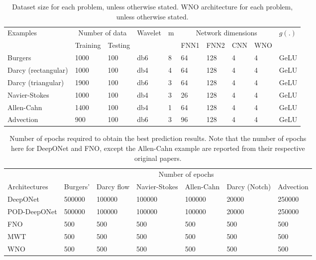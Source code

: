 \documentclass{article}
\begin{document}
\begin{table}[ht!]
    \centering
    \caption{Dataset size for each problem, unless otherwise stated. WNO architecture for each problem, unless otherwise stated.}
    \label{tab:network_param}
    \begin{tabular}{p{4cm}lllllllll}
    \hline
    \multirow{2}{*}{Examples} & \multicolumn{2}{c}{Number of data} & \multirow{2}{*}{Wavelet} & \multirow{2}{*}{m} & \multicolumn{4}{c}{Network dimensions} & \multirow{2}{*}{$g(.)$} \\ \cline{2-3}\cline{6-9}
     & Training & Testing & & & FNN1 & FNN2 & CNN & WNO & \\
    \hline
    Burgers & 1000 & 100 & db6 & 8 & 64 & 128 & 4 & 4 & GeLU\\
    Darcy (rectangular) & 1000 & 100 & db4 & 4 & 64 & 128 & 4 & 4 & GeLU\\
    Darcy (triangular) & 1900 & 100 & db6 & 3 & 64 & 128 & 4 & 4 & GeLU \\
    Navier-Stokes & 1000 & 100 & db4 & 3 & 26 & 128 & 4 & 4 & GeLU\\
    Allen-Cahn & 1400 & 100 & db4 & 1 & 64 & 128 & 4 & 4 & GeLU\\
    Advection & 900 & 100 & db6 & 3 & 96 & 128 & 4 & 4 & GeLU\\
    \hline
    \end{tabular}
\end{table}

\begin{table}[ht]
	\centering
	\caption{Number of epochs required to obtain the best prediction results. Note that the number of epochs here for DeepONet and FNO, except the Allen-Cahn example are reported from their respective original papers.}
	\label{table_epochs}
	\begin{tabular}{p{3cm} llllll}
		\hline
		& \multicolumn{6}{c}{Number of epochs} \\ \cline{2-7}
		Architectures & Burgers' & Darcy flow & Navier-Stokes & Allen-Cahn & Darcy (Notch) & Advection \\
		\hline
		DeepONet & 500000 &  100000 & 100000 & 100000 & 20000 & 250000 \\
		POD-DeepONet & 500000 &  100000 & 100000 & 100000 & 20000 & 250000 \\
		FNO & 500 & 500 & 500 & 500 & 500 & 500 \\
		MWT & 500 & 500 & 500 & 500 & 500 & 500 \\ \hdashline
		WNO & 500 & 500 & 500 & 500 & 500 & 500 \\
		\hline
	\end{tabular}
\end{table}
\end{document}
